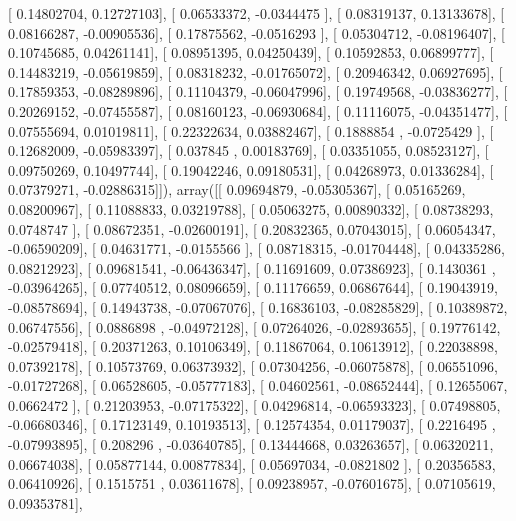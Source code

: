 \documentclass{article}
\begin{document}
       [ 0.14802704,  0.12727103],
       [ 0.06533372, -0.0344475 ],
       [ 0.08319137,  0.13133678],
       [ 0.08166287, -0.00905536],
       [ 0.17875562, -0.0516293 ],
       [ 0.05304712, -0.08196407],
       [ 0.10745685,  0.04261141],
       [ 0.08951395,  0.04250439],
       [ 0.10592853,  0.06899777],
       [ 0.14483219, -0.05619859],
       [ 0.08318232, -0.01765072],
       [ 0.20946342,  0.06927695],
       [ 0.17859353, -0.08289896],
       [ 0.11104379, -0.06047996],
       [ 0.19749568, -0.03836277],
       [ 0.20269152, -0.07455587],
       [ 0.08160123, -0.06930684],
       [ 0.11116075, -0.04351477],
       [ 0.07555694,  0.01019811],
       [ 0.22322634,  0.03882467],
       [ 0.1888854 , -0.0725429 ],
       [ 0.12682009, -0.05983397],
       [ 0.037845  ,  0.00183769],
       [ 0.03351055,  0.08523127],
       [ 0.09750269,  0.10497744],
       [ 0.19042246,  0.09180531],
       [ 0.04268973,  0.01336284],
       [ 0.07379271, -0.02886315]]), array([[ 0.09694879, -0.05305367],
       [ 0.05165269,  0.08200967],
       [ 0.11088833,  0.03219788],
       [ 0.05063275,  0.00890332],
       [ 0.08738293,  0.0748747 ],
       [ 0.08672351, -0.02600191],
       [ 0.20832365,  0.07043015],
       [ 0.06054347, -0.06590209],
       [ 0.04631771, -0.0155566 ],
       [ 0.08718315, -0.01704448],
       [ 0.04335286,  0.08212923],
       [ 0.09681541, -0.06436347],
       [ 0.11691609,  0.07386923],
       [ 0.1430361 , -0.03964265],
       [ 0.07740512,  0.08096659],
       [ 0.11176659,  0.06867644],
       [ 0.19043919, -0.08578694],
       [ 0.14943738, -0.07067076],
       [ 0.16836103, -0.08285829],
       [ 0.10389872,  0.06747556],
       [ 0.0886898 , -0.04972128],
       [ 0.07264026, -0.02893655],
       [ 0.19776142, -0.02579418],
       [ 0.20371263,  0.10106349],
       [ 0.11867064,  0.10613912],
       [ 0.22038898,  0.07392178],
       [ 0.10573769,  0.06373932],
       [ 0.07304256, -0.06075878],
       [ 0.06551096, -0.01727268],
       [ 0.06528605, -0.05777183],
       [ 0.04602561, -0.08652444],
       [ 0.12655067,  0.0662472 ],
       [ 0.21203953, -0.07175322],
       [ 0.04296814, -0.06593323],
       [ 0.07498805, -0.06680346],
       [ 0.17123149,  0.10193513],
       [ 0.12574354,  0.01179037],
       [ 0.2216495 , -0.07993895],
       [ 0.208296  , -0.03640785],
       [ 0.13444668,  0.03263657],
       [ 0.06320211,  0.06674038],
       [ 0.05877144,  0.00877834],
       [ 0.05697034, -0.0821802 ],
       [ 0.20356583,  0.06410926],
       [ 0.1515751 ,  0.03611678],
       [ 0.09238957, -0.07601675],
       [ 0.07105619,  0.09353781],
\end{document}
